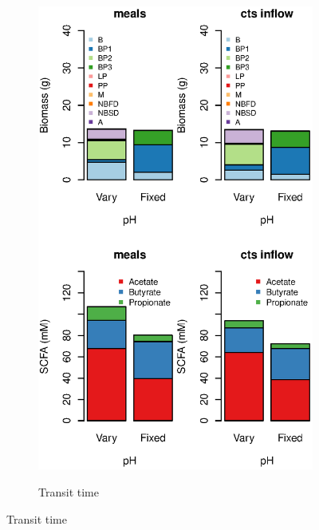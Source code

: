 \documentclass[a4paper]{article}
\begin{document}
\begin{figure}
\begin{subfigure}[t]{0.32\textwidth}
      \includegraphics[scale=0.35]{images/fixpHbarSmall.eps}
    \end{subfigure}
    \begin{subfigure}[t]{0.32\textwidth}
      \caption{Transit time}

\end{subfigure}
\end{figure}
\end{document}
